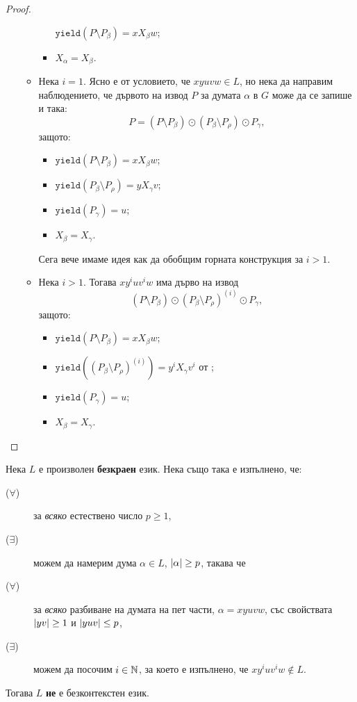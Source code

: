 \begin{proof}
\begin{enumerate}[1)]
\begin{itemize}
\begin{itemize}
        $\texttt{yield}(P \setminus P_\beta) = x X_\beta w$;
      \item
        $X_\alpha = X_\beta$.
      \end{itemize}
    \item
      Нека $i = 1$.
      Ясно е от условието, че $xyuvw \in L$, но нека да направим наблюдението, че дървото на извод $P$ за думата $\alpha$ в $G$
      може да се запише и така:
      \[P = (P \setminus P_\beta) \odot (P_\beta \setminus P_\rho) \odot P_\gamma, \]
      защото:
      \begin{itemize}
      \item
        $\texttt{yield}(P\setminus P_\beta) = x X_\beta w$;
      \item
        $\texttt{yield}(P_\beta \setminus P_\rho) = y X_\gamma v$;
      \item
        $\texttt{yield}(P_\gamma) = u$;
      \item
        $X_\beta = X_\gamma$.
      \end{itemize}
      Сега вече имаме идея как да обобщим горната конструкция за $i > 1$.
    \item
      Нека $i > 1$. Тогава $xy^iuv^iw$ има дърво на извод
      \[(P \setminus P_\beta) \odot (P_\beta \setminus P_\rho)^{(i)} \odot P_\gamma,\]
      защото:
      \begin{itemize}
      \item
        $\texttt{yield}(P\setminus P_\beta) = x X_\beta w$;
      \item
        $\texttt{yield}((P_\beta \setminus P_\rho)^{(i)}) = y^i X_\gamma v^i$ от ;
      \item
        $\texttt{yield}(P_\gamma) = u$;
      \item
        $X_\beta = X_\gamma$.
      \end{itemize}
    \end{itemize}

  \end{enumerate}
\end{proof}

\begin{cor}
  \label{cor:pumping-context-free}
  Нека $L$ е произволен {\bf безкраен} език. Нека също така е изпълнено, че:
  \begin{description}
  \item[($\forall$)]
    за {\em всяко} естествено число $p \geq 1$,
  \item[($\exists$)]
    можем да намерим дума $\alpha \in L$, $\vert{\alpha}\vert\geq p$, такава че
  \item[($\forall$)]
    за {\em всяко} разбиване на думата на пет части, $\alpha = xyuvw$, със свойствата $\vert{yv}\vert \geq 1$ и $\vert{yuv}\vert \leq p$,
  \item[($\exists$)]
    можем да посочим $i \in \mathbb{N}$, за което е изпълнено, че $xy^iuv^iw \not\in L$.
  \end{description}  
  Тогава $L$ {\bf не} е безконтекстен език.
\end{cor}

